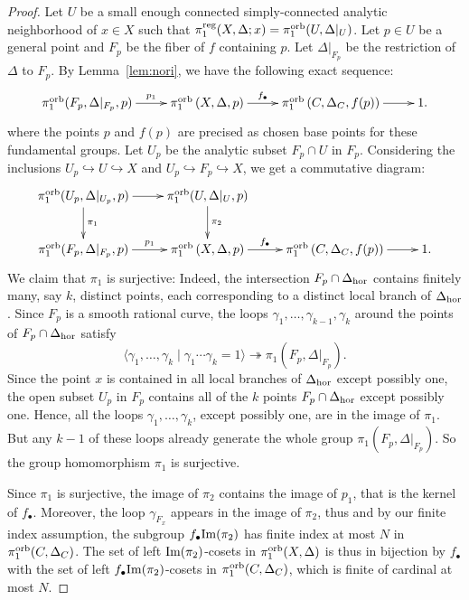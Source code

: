\documentclass{amsart}
\theoremstyle{definition}
\theoremstyle{remark}
\numberwithin{equation}{section}
\begin{document}
\begin{proof}
Let $U$ be a small enough connected simply-connected analytic neighborhood of $x\in X$ such that $\pi_1^{\rm reg}(X,\Delta;x)=\pi_1^{\rm orb}(U,\Delta|_U)$.
Let $p\in U$ be a general point
and $F_p$ be the fiber of $f$ containing $p$.
Let $\Delta|_{F_p}$ be the restriction of $\Delta$ to $F_p$.
By Lemma~\ref{lem:nori}, we have the following exact sequence:
\[
\xymatrix{
\pi_1^{\rm orb}(F_p,\Delta|_{F_p},p)\ar[r]^-{p_1}&
\pi_1^{\rm orb}\left(X,\Delta,p\right)\ar[r]^-{f_{\bullet}}&
\pi_1^{\rm orb}\left( 
C,\Delta_C, f(p) \right)\ar[r] & 1.
}
\]
where the points $p$ and $f(p)$ are precised as chosen base points for these fundamental groups.
Let $U_p$ be the analytic subset $F_p\cap U$ in $F_p$. 
Considering the inclusions 
$U_p \hookrightarrow U \hookrightarrow X$ and $U_p \hookrightarrow F_p \hookrightarrow X$, we get 
a commutative diagram:
\[
\xymatrix{ 
\pi_1^{\rm orb}(U_p,\Delta|_{U_p},p)\ar[r]\ar[d]^-{\pi_1} & \pi_1^{\rm orb}(U,\Delta|_{U},p)\ar[d]^-{\pi_2} & & \\ 
\pi_1^{\rm orb}(F_p,\Delta|_{F_p},p)\ar[r]^-{p_1}&
\pi_1^{\rm orb}\left(X,\Delta,p\right)\ar[r]^-{f_{\bullet}}&
\pi_1^{\rm orb}\left( 
C,\Delta_C,f(p) 
\right)\ar[r] & 1 .
}
\]
We claim that $\pi_1$ is surjective: Indeed, the intersection $F_p\cap \Delta_{\rm hor}$ contains finitely many, say $k$, distinct points, each corresponding to a distinct local branch of $\Delta_{\rm hor}$. Since $F_p$ is a smooth rational curve, the loops $\gamma_1,\ldots,\gamma_{k-1},\gamma_k$ around the points of $F_p\cap \Delta_{\rm hor}$ satisfy $$\langle \gamma_1,\ldots,\gamma_k\mid \gamma_1\cdots\gamma_k = 1 \rangle\twoheadrightarrow\pi_1(F_p,\Delta|_{F_p}).$$ 
Since the point $x$ is contained in all local branches of $\Delta_{\rm hor}$ except possibly one, the open subset $U_p$ in $F_p$ contains all of the $k$ points $F_p\cap \Delta_{\rm hor}$ except possibly one. Hence, all the loops $\gamma_1,\ldots,\gamma_k$, except possibly one, are in the image of $\pi_1$. But any $k-1$ of these loops already generate the whole group $\pi_1(F_p,\Delta|_{F_p})$. So the group homomorphism $\pi_1$ is surjective.

Since $\pi_1$ is surjective, the image of $\pi_2$ contains the image of $p_1$, that is the kernel of $f_{\bullet}$. Moreover, the loop $\gamma_{F_x}$ appears in the image of $\pi_2$, thus and by our finite index assumption, the subgroup $f_{\bullet}{\rm Im}(\pi_2)$ has finite index at most $N$ in $\pi_1^{\rm orb}(C,\Delta_C)$.
The set of left ${\rm Im}(\pi_2)$-cosets in $\pi_1^{\rm orb}(X,\Delta)$ is thus in bijection by $f_{\bullet}$ with the set of left $f_{\bullet}{\rm Im}(\pi_2)$-cosets in $\pi_1^{\rm orb}(C,\Delta_C)$, which is finite of cardinal at most $N$.
\end{proof}
\end{document}
